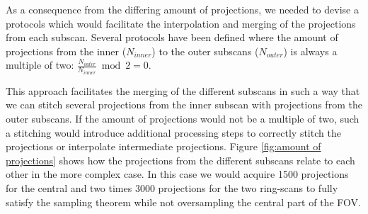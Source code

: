 As a consequence from the differing amount of projections, we needed to devise a protocols which would facilitate the interpolation and merging of the projections from each subscan. Several protocols have been defined where the amount of projections from the inner ($N_{inner}$) to the outer subscans ($N_{outer}$) is always a multiple of two: $\frac{N_{outer}}{N_{inner}} \bmod 2 = 0$.

This approach facilitates the merging of the different subscans in such a way that we can stitch several projections from the inner subscan with projections from the outer subscans. If the amount of projections would not be a multiple of two, such a stitching would introduce additional processing steps to correctly stitch the projections or interpolate intermediate projections. \cbend Figure \ref{fig:amount of projections} shows how the projections from the different subscans relate to each other in the more complex case. In this case we would acquire 1500 projections for the central and two times 3000 projections for the two ring-scans to fully satisfy the sampling theorem while not oversampling the central part of the FOV. 

\begin{figure*}[htp]
	\centering
	\caption[Number of merged projections for one central- and two ring-scan.]{Number of merged projections for one central- and two ring-scan. We assume that we have obtained 1500 projections for the central scan and thus acquire two times 1500 projections for each of the lateral scans. This enables us to stitch the projections $P_{1_{284}}$ %
 		(red line) from subscan 1 (ring scan, red area), projection $P_{2_{142}}$ %
 		(green line) from subscan 2 (central scan, green area) and projection $P_{3_{283}}$ %
 		(blue line) of subscan 3 (ring scan, blue area) to one big projection $P_{merge_{284}}$ %
		which covers the full FOV. The areas of the three subscans overlap slightly as described above to account for variations in positioning. For illustration purposes we shifted the central projection (green) by \SI{2}{\degree}, otherwise the overlap between these particular projection would not be visible.}%
	\label{fig:amount of projections}%
\end{figure*}

\cbstart
